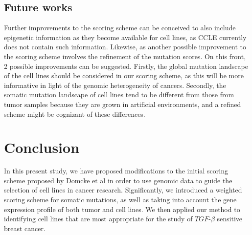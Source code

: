\documentclass[a4paper,12pt]{article}
\begin{document}
\subsection{Future works}
Further improvements to the scoring scheme can be conceived to also
include epigenetic information as they become available for cell
lines, as CCLE currently does not contain such information.
Likewise, as another possible improvement to the scoring scheme
involves the refinement of the mutation scores. On this front, 2
possible improvements can be suggested. Firstly, the global mutation
landscape of the cell lines should be considered in our scoring
scheme, as this will be more informative in light of the genomic
heterogeneity of cancers. Secondly, the somatic mutation landscape of
cell lines tend to be different from those from tumor samples because
they are grown in artificial environments, and a refined scheme might
be cognizant of these differences.

\section{Conclusion}
In this present study, we have proposed modifications to the initial scoring
scheme proposed by Domcke et al in order to use genomic data to guide
the selection of cell lines in cancer research. Significantly, we
introduced a weighted scoring scheme for somatic mutations, as well as
taking into account the gene expression profile of both tumor and cell
lines. We then applied our method to identifying cell lines that are
most appropriate for the study of $\textit{TGF}$-$\beta$ sensitive
breast cancer.
\newpage
{}

\end{document}
